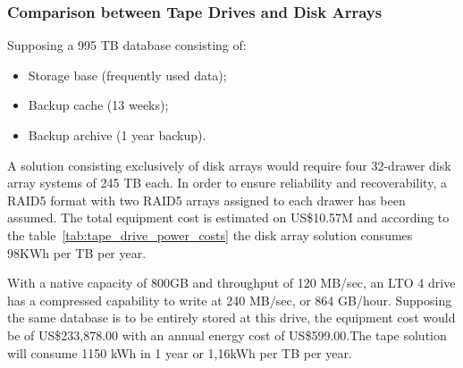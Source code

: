 {            \subsubsection*{Comparison between Tape Drives and Disk Arrays}
                Supposing a 995 TB database consisting of:
                \begin{itemize}
                	\item Storage base (frequently used data);
                	\item Backup cache (13 weeks);
                	\item Backup archive (1 year backup).
                \end{itemize}
                A solution consisting exclusively of disk arrays would require four 32-drawer disk array systems of 245 TB each. In order to ensure reliability and recoverability, a RAID5 format with two RAID5 arrays assigned to each drawer has been assumed. The total equipment cost is estimated on US\$10.57M \cite{Reine08} and according to the table~\ref{tab:tape_drive_power_costs} the disk array solution consumes 98KWh per TB per year.
                \begin{table}[h!tb]
                \centering 
                \label{tab:tape_drive_power_costs} %
                \end{table}
                With a native capacity of 800GB and throughput of 120 MB/sec, an LTO 4 drive has a compressed capability to write at 240 MB/sec, or 864 GB/hour. Supposing the same database is to be entirely stored at this drive, the equipment cost would be of US\$233,878.00 with an annual energy cost of US\$599.00.The tape solution will consume 1150 kWh in 1 year or 1,16kWh per TB per year.
}
